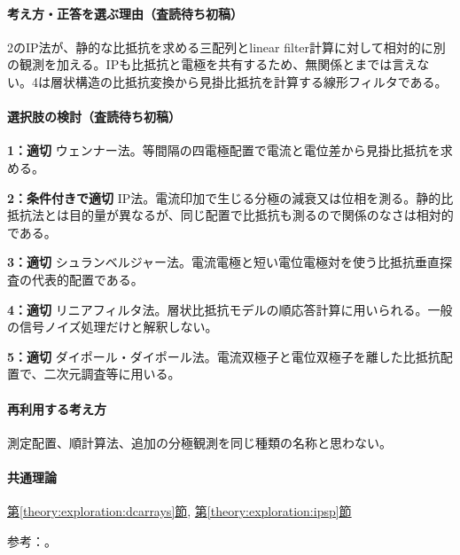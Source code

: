 \paragraph{考え方・正答を選ぶ理由（査読待ち初稿）} 2のIP法が、静的な比抵抗を求める三配列とlinear filter計算に対して相対的に別の観測を加える。IPも比抵抗と電極を共有するため、無関係とまでは言えない。4は層状構造の比抵抗変換から見掛比抵抗を計算する線形フィルタである。

\paragraph{選択肢の検討（査読待ち初稿）}\mbox{}\par

\noindent\textbf{1：適切} ウェンナー法。等間隔の四電極配置で電流と電位差から見掛比抵抗を求める。\par

\noindent\textbf{2：条件付きで適切} IP法。電流印加で生じる分極の減衰又は位相を測る。静的比抵抗法とは目的量が異なるが、同じ配置で比抵抗も測るので関係のなさは相対的である。\par

\noindent\textbf{3：適切} シュランベルジャー法。電流電極と短い電位電極対を使う比抵抗垂直探査の代表的配置である。\par

\noindent\textbf{4：適切} リニアフィルタ法。層状比抵抗モデルの順応答計算に用いられる。一般の信号ノイズ処理だけと解釈しない。\par

\noindent\textbf{5：適切} ダイポール・ダイポール法。電流双極子と電位双極子を離した比抵抗配置で、二次元調査等に用いる。\par

\paragraph{再利用する考え方} 測定配置、順計算法、追加の分極観測を同じ種類の名称と思わない。

\paragraph{共通理論} \hyperref[theory:exploration:dcarrays]{第\ref*{theory:exploration:dcarrays}節}, \hyperref[theory:exploration:ipsp]{第\ref*{theory:exploration:ipsp}節}

\par 参考：\cite{epa_resistivity,epa_ip,usgs_linear_filter1981}。

